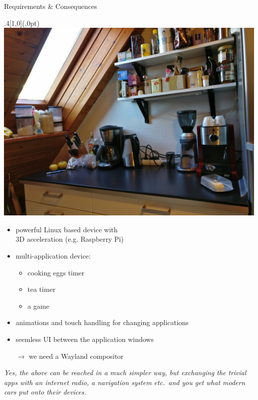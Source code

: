 \documentclass[ucs,9pt]{beamer}
\begin{document}
\begin{frame}
    {Requirements \& Consequences}

    \begin{textblock*}{.4\paperwidth}[1,0](\paperwidth,0pt)%
        \includegraphics[width=\linewidth]{kitchen-right.jpg}
    \end{textblock*}%

    \begin{itemize}
        \item powerful Linux based device with\\
            3D acceleration (e.g. Raspberry Pi)
        \item multi-application device:
            \begin{itemize}
                \item cooking eggs timer
                \item tea timer
                \item a game
            \end{itemize}
        \item animations and touch handling for changing applications
        \item seemless UI between the application windows
        \item [$\rightarrow$] we need a Wayland compositor
    \end{itemize}
    \bigskip

    \emph{Yes, the above can be reached in a much simpler way, but exchanging the trivial apps with an internet radio, a navigation system etc.\ and you get what modern cars put onto their devices.}
\end{frame}
\end{document}
